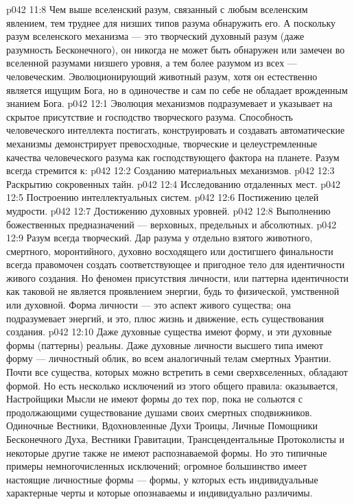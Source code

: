 \vs p042 11:8 Чем выше вселенский разум, связанный с любым вселенским явлением, тем труднее для низших типов разума обнаружить его. А поскольку разум вселенского механизма --- это творческий духовный разум (даже разумность Бесконечного), он никогда не может быть обнаружен или замечен во вселенной разумами низшего уровня, а тем более  разумом из всех --- человеческим. Эволюционирующий животный разум, хотя он естественно является ищущим Бога, но в одиночестве и сам по себе не обладает врожденным знанием Бога.
\vs p042 12:1 Эволюция механизмов подразумевает и указывает на скрытое присутствие и господство творческого разума. Способность человеческого интеллекта постигать, конструировать и создавать автоматические механизмы демонстрирует превосходные, творческие и целеустремленные качества человеческого разума как господствующего фактора на планете. Разум всегда стремится к:
\vs p042 12:2 \bibnobreakspace Созданию материальных механизмов.
\vs p042 12:3 \bibnobreakspace Раскрытию сокровенных тайн.
\vs p042 12:4 \bibnobreakspace Исследованию отдаленных мест.
\vs p042 12:5 \bibnobreakspace Построению интеллектуальных систем.
\vs p042 12:6 \bibnobreakspace Постижению целей мудрости.
\vs p042 12:7 \bibnobreakspace Достижению духовных уровней.
\vs p042 12:8 \bibnobreakspace Выполнению божественных предназначений --- верховных, предельных и абсолютных.
\vs p042 12:9 \pc Разум всегда творческий. Дар разума у отдельно взятого животного, смертного, моронтийного, духовно восходящего или достигшего финальности всегда правомочен создать соответствующее и пригодное тело для идентичности живого создания. Но феномен присутствия личности, или паттерна идентичности как таковой не является проявлением энергии, будь то физической, умственной или духовной. Форма личности --- это  аспект живого существа; она подразумевает  энергий, и это, плюс жизнь и движение, есть  существования создания.
\vs p042 12:10 Даже духовные существа имеют форму, и эти духовные формы (паттерны) реальны. Даже духовные личности высшего типа имеют форму --- личностный облик, во всем аналогичный телам смертных Урантии. Почти все существа, которых можно встретить в семи сверхвселенных, обладают формой. Но есть несколько исключений из этого общего правила: оказывается, Настройщики Мысли не имеют формы до тех пор, пока не сольются с продолжающими существование душами своих смертных сподвижников. Одиночные Вестники, Вдохновленные Духи Троицы, Личные Помощники Бесконечного Духа, Вестники Гравитации, Трансцендентальные Протоколисты и некоторые другие также не имеют распознаваемой формы. Но это типичные примеры немногочисленных исключений; огромное большинство имеет настоящие личностные формы --- формы, у которых есть индивидуальные характерные черты и которые опознаваемы и индивидуально различимы.
